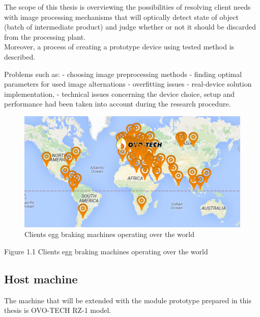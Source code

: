 \documentclass[12pt,twoside,a4paper]{article}
\begin{document}
The scope of this thesis is overviewing the possibilities of resolving client needs with image processing mechanisms that will optically detect state of object (batch of  intermediate product) and judge whether or not it should be discarded from the processing plant.\\
Moreover, a process of creating a prototype device using tested method  is described.

Problems such as:
- choosing image preprocessing methods
- finding optimal  parameters for used image alternations
- overfitting issues
- real-device solution implementation, 
- technical issues concerning the device choice, setup and performance 
had been taken  into account during the research procedure.






\begin{figure}[H]
\centering
\includegraphics[width=0.4\paperwidth]{map}
\caption{Clients egg braking machines operating over the world}
\end{figure}

Figure 1.1 Clients egg braking machines operating over the world


\subsection{Host machine}
The machine that will be extended with the module prototype prepared in this thesis is OVO-TECH RZ-1 model.
\end{document}
